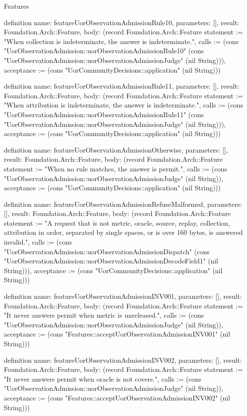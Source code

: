 \begin{lexlean}{Features}
\begin{semanticmodule}
definition{
  name: featureUorObservationAdmissionRule10,
  parameters: [],
  result: Foundation.Arch::Feature,
  body: (record Foundation.Arch::Feature {statement := "When collection is indeterminate, the answer is indeterminate.", calls := (cons "UorObservationAdmission::uorObservationAdmissionRule10" (cons "UorObservationAdmission::uorObservationAdmissionJudge" (nil String))), acceptance := (cons "UorCommunityDecisions::application" (nil String))})
}

definition{
  name: featureUorObservationAdmissionRule11,
  parameters: [],
  result: Foundation.Arch::Feature,
  body: (record Foundation.Arch::Feature {statement := "When attribution is indeterminate, the answer is indeterminate.", calls := (cons "UorObservationAdmission::uorObservationAdmissionRule11" (cons "UorObservationAdmission::uorObservationAdmissionJudge" (nil String))), acceptance := (cons "UorCommunityDecisions::application" (nil String))})
}

definition{
  name: featureUorObservationAdmissionOtherwise,
  parameters: [],
  result: Foundation.Arch::Feature,
  body: (record Foundation.Arch::Feature {statement := "When no rule matches, the answer is permit.", calls := (cons "UorObservationAdmission::uorObservationAdmissionJudge" (nil String)), acceptance := (cons "UorCommunityDecisions::application" (nil String))})
}

definition{
  name: featureUorObservationAdmissionRefuseMalformed,
  parameters: [],
  result: Foundation.Arch::Feature,
  body: (record Foundation.Arch::Feature {statement := "A request that is not metric, oracle, source, replay, collection, attribution in order, separated by single spaces, or is over 160 bytes, is answered invalid.", calls := (cons "UorObservationAdmission::uorObservationAdmissionDispatch" (cons "UorObservationAdmission::uorObservationAdmissionDecodeField1" (nil String))), acceptance := (cons "UorCommunityDecisions::application" (nil String))})
}

definition{
  name: featureUorObservationAdmissionINV001,
  parameters: [],
  result: Foundation.Arch::Feature,
  body: (record Foundation.Arch::Feature {statement := "It never answers permit when metric is unreleased.", calls := (cons "UorObservationAdmission::uorObservationAdmissionJudge" (nil String)), acceptance := (cons "Features::acceptUorObservationAdmissionINV001" (nil String))})
}

definition{
  name: featureUorObservationAdmissionINV002,
  parameters: [],
  result: Foundation.Arch::Feature,
  body: (record Foundation.Arch::Feature {statement := "It never answers permit when oracle is not covers.", calls := (cons "UorObservationAdmission::uorObservationAdmissionJudge" (nil String)), acceptance := (cons "Features::acceptUorObservationAdmissionINV002" (nil String))})
}


\end{semanticmodule}
\end{lexlean}
